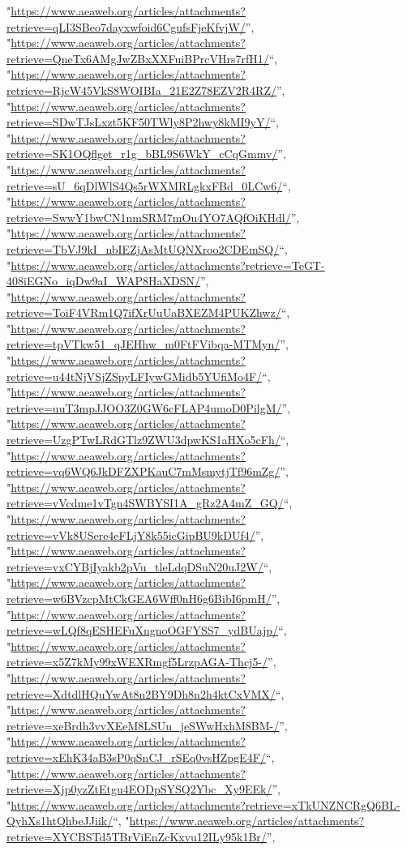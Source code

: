 \documentclass[]{article}
\begin{document}
\begin{itemize}
  "\url{https://www.aeaweb.org/articles/attachments?retrieve=qLI3SBeo7dayxwfoid6CgufsFjeKfvjW/}'',
  "\url{https://www.aeaweb.org/articles/attachments?retrieve=QneTx6AMgJwZBxXXFuiBPrcVHrs7rfH1/}``,
  "\url{https://www.aeaweb.org/articles/attachments?retrieve=RjcW45VkS8WOIBIa_21E2Z78EZV2R4RZ/}'',
  "\url{https://www.aeaweb.org/articles/attachments?retrieve=SDwTJsLxzt5KF50TWly8P2hwy8kMI9yY/}``,
  "\url{https://www.aeaweb.org/articles/attachments?retrieve=SK1OQflget_r1g_bBL9S6WkY_cCqGmmv/}'',
  "\url{https://www.aeaweb.org/articles/attachments?retrieve=sU_6qDlWlS4Qs5rWXMRLgkxFBd_0LCw6/}``,
  "\url{https://www.aeaweb.org/articles/attachments?retrieve=SwwY1bwCN1nmSRM7mOu4YO7AQfOiKHdl/}'',
  "\url{https://www.aeaweb.org/articles/attachments?retrieve=TbVJ9kI_nbIEZjAsMtUQNXroo2CDEmSQ/}``,
  "\url{https://www.aeaweb.org/articles/attachments?retrieve=TeGT-408iEGNo_iqDw9aI_WAP8HaXDSN/}'',
  "\url{https://www.aeaweb.org/articles/attachments?retrieve=ToiF4VRm1Q7ifXrUuUaBXEZM4PUKZhwz/}``,
  "\url{https://www.aeaweb.org/articles/attachments?retrieve=tpVTkw51_qJEHhw_m0FtFVibqa-MTMyn/}'',
  "\url{https://www.aeaweb.org/articles/attachments?retrieve=u44tNjVSjZSpyLFIywGMidb5YUfiMo4F/}``,
  "\url{https://www.aeaweb.org/articles/attachments?retrieve=uuT3mpJJOO3Z0GW6cFLAP4umoD0PilgM/}'',
  "\url{https://www.aeaweb.org/articles/attachments?retrieve=UzgPTwLRdGTlz9ZWU3dpwKS1aHXo5cFh/}``,
  "\url{https://www.aeaweb.org/articles/attachments?retrieve=vq6WQ6JkDFZXPKauC7mMsmytjTf96mZg/}'',
  "\url{https://www.aeaweb.org/articles/attachments?retrieve=vVcdme1vTgn4SWBYSI1A_gRz2A4mZ_GQ/}``,
  "\url{https://www.aeaweb.org/articles/attachments?retrieve=vVk8USere4eFLjY8k55icGipBU9kDUf4/}'',
  "\url{https://www.aeaweb.org/articles/attachments?retrieve=vxCYBjIyakb2pVu_tleLdqDSuN20uJ2W/}``,
  "\url{https://www.aeaweb.org/articles/attachments?retrieve=w6BVzcpMtCkGEA6Wff0nH6g6BibI6pmH/}'',
  "\url{https://www.aeaweb.org/articles/attachments?retrieve=wLQf8qESHEFuXngnoOGFYSS7_ydBUajp/}``,
  "\url{https://www.aeaweb.org/articles/attachments?retrieve=x5Z7kMy99xWEXRmgf5LrzpAGA-Thcj5-/}'',
  "\url{https://www.aeaweb.org/articles/attachments?retrieve=XdtdlHQuYwAt8n2BY9Dh8n2h4ktCxVMX/}``,
  "\url{https://www.aeaweb.org/articles/attachments?retrieve=xeBrdh3vvXEeM8LSUu_jeSWwHxhM8BM-/}'',
  "\url{https://www.aeaweb.org/articles/attachments?retrieve=xEhK34aB3sP0qSnCJ_rSEq0vsHZpgE4F/}``,
  "\url{https://www.aeaweb.org/articles/attachments?retrieve=Xjp0yzZtEtgu4EODpSYSQ2Ybc_Xy9EEk/}'',
  "\url{https://www.aeaweb.org/articles/attachments?retrieve=xTkUNZNCRgQ6BL-QyhXs1htQhbeJJiik/}``,
  "\url{https://www.aeaweb.org/articles/attachments?retrieve=XYCBSTd5TBrViEnZcKxvu12ILy95k1Br/}'',

\end{itemize}
\end{document}
